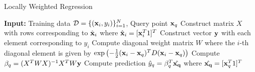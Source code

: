 \begin{algorithm}[t]
  \caption{Locally Weighted Regression}
  \begin{algorithmic}[1]
    \State \textbf{Input:} Training data $\mathcal{D} = \{(\mathbf{x}_i,
    y_i)\}_{i=1}^N$, Query point $\mathbf{x}_q$
    \State Construct matrix $X$ with rows corresponding to $\hat{\mathbf{x}}_i$
    where $\hat{\mathbf{x}}_i = [\mathbf{x}_i^T 1]^T$
    \State Construct vector $\mathbf{y}$ with each element corresponding
    to $y_i$
    \State Compute diagonal weight matrix $W$ where the $i$-th
    diagonal element is given by $\exp\left( -\frac{1}{2} (\mathbf{x}_i -
      \mathbf{x}_q)^TD(\mathbf{x}_i - \mathbf{x}_q) \right)$
    \State Compute $\beta_q = (X^TWX)^{-1}X^TW\mathbf{y}$
    \State Compute prediction $\hat{y}_q = \beta_q^T\hat{\mathbf{x}_q}$
    where $\hat{\mathbf{x}_q} = [\mathbf{x}_q^T 1]^T$
  \end{algorithmic}
  \label{alg:lwr}
\end{algorithm}


